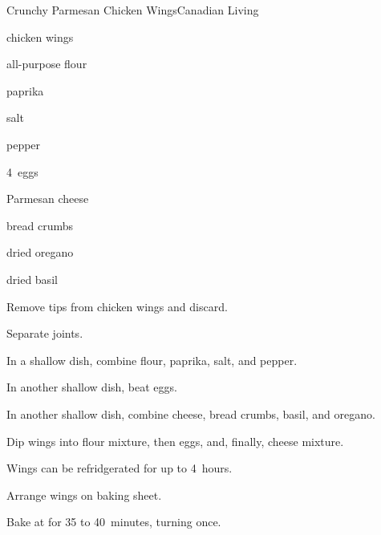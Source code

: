 \begin{recipe}{Crunchy Parmesan Chicken Wings}{Canadian Living}{}

\begin{ingredients}
\item {} chicken wings
\item \C{\half} all-purpose flour
\item \tp{\half} paprika
\item \tp{\quarter} salt
\item \tp{\quarter} pepper
\item 4~eggs
\item {} Parmesan cheese
\item \C{\half} bread crumbs
\item {} dried oregano
\item {} dried basil
\end{ingredients}

\begin{directions}
\item Remove tips from chicken wings and discard.
\item Separate joints.
\item In a shallow dish, combine flour, paprika, salt, and pepper.
\item In another shallow dish, beat eggs.
\item In another shallow dish, combine cheese, bread crumbs, basil, and oregano.
\item Dip wings into flour mixture, then eggs, and, finally, cheese mixture.
\item Wings can be refridgerated for up to 4~hours.
\item Arrange wings on baking sheet.
\item Bake at  for 35 to 40~minutes, turning once.
\end{directions}

\end{recipe}
